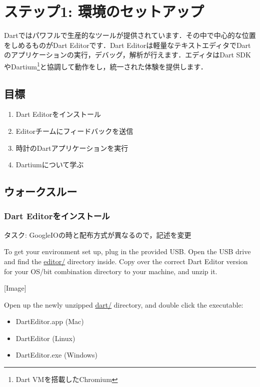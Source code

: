 \section{ステップ1: 環境のセットアップ}

Dartではパワフルで生産的なツールが提供されています．その中で中心的な位置をしめるものがDart Editorです．Dart Editorは軽量なテキストエディタでDartのアプリケーションの実行，デバッグ，解析が行えます．エディタはDart SDKやDartium\footnote{Dart VMを搭載したChromium}と協調して動作をし，統一された体験を提供します．

\subsection{目標}

\begin{enumerate}
\item Dart Editorをインストール
\item Editorチームにフィードバックを送信
\item 時計のDartアプリケーションを実行
\item Dartiumについて学ぶ
\end{enumerate}

\subsection{ウォークスルー}

\subsubsection{Dart Editorをインストール}

タスク: GoogleIOの時と配布方式が異なるので，記述を変更

To get your environment set up, plug in the provided USB. Open the USB drive and find the \url{editor/} directory inside. Copy over the correct Dart Editor version for your OS/bit combination directory to your machine, and unzip it.

[Image]

Open up the newly unzipped \url{dart/} directory, and double click the executable:

\begin{itemize}
\item DartEditor.app (Mac)
\item DartEditor (Linux)
\item DartEditor.exe (Windows)
\end{itemize}

